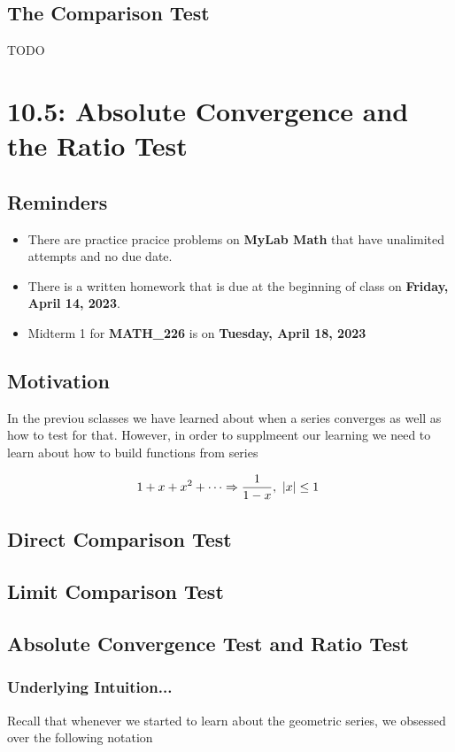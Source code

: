 \documentclass{report}
\begin{document}
\begin{sloppypar}
\section{The Comparison Test}
TODO
\chapter{10.5: Absolute Convergence and the Ratio Test}
\section{Reminders}
\begin{itemize}
  \item There are practice pracice problems on \textbf{MyLab Math} that have unalimited attempts and no due date.
  \item There is a written homework that is due at the beginning of class on \textbf{Friday, April 14, 2023}.
        \item Midterm 1 for \textbf{MATH\_226} is on \textbf{Tuesday, April 18, 2023}

\end{itemize}


\section{Motivation}
In the previou sclasses we have learned about when a series converges as well as how to test for that.
However, in order to supplmeent our learning we need to learn about how to build functions from series

\[ 1 + x + x^{2} + \cdots \Rightarrow \frac{1}{1-x}, \textrm{ $ |x | \leq 1 $ } \]

\section{Direct Comparison Test}
\section{Limit Comparison Test}
\section{Absolute Convergence Test and Ratio Test}
\subsection{Underlying Intuition...}
Recall that whenever we started to learn about the geometric series,
we obsessed over the following notation


\end{sloppypar}
\end{document}
